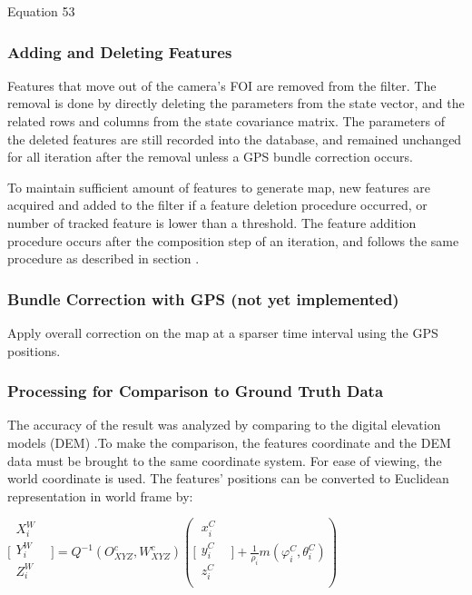 Equation 53

\subsubsection{Adding and Deleting 
Features}\label{section:_Toc332876136}
Features that move out of the camera's FOI are removed from the filter. 
The removal is done by directly deleting the parameters from the state 
vector, and the related rows and columns from the state covariance 
matrix. The parameters of the deleted features are still recorded into 
the database, and remained unchanged for all iteration after the removal 
unless a GPS bundle correction occurs. 

To maintain sufficient amount of features to generate map, new features 
are acquired and added to the filter if a feature deletion procedure 
occurred, or number of tracked feature is lower than a threshold. The 
feature addition procedure occurs after the composition step of an 
iteration, and follows the same procedure as described in section . 

\subsubsection{Bundle Correction with GPS (not yet 
implemented)}\label{section:_Toc332876138}
Apply overall correction on the map at a sparser time interval using the 
GPS positions. 

\subsubsection{Processing for Comparison to Ground Truth Data}
The accuracy of the result was analyzed by comparing to the digital 
elevation models (DEM) .To make the comparison, the features coordinate 
and the DEM data must be brought to the same coordinate system. For ease 
of viewing, the world coordinate is used. The features' positions can be 
converted to Euclidean representation in world frame by: 

$\lbrack \begin{matrix}
X_{i}^{W} & \\
Y_{i}^{W} & \\
Z_{i}^{W} & \\
\end{matrix}
\rbrack =Q^{-1}(O_{XYZ}^{c}, W_{XYZ}^{c})(\lbrack \begin{matrix}
x_{i}^{C} & \\
y_{i}^{C} & \\
z_{i}^{C} & \\
\end{matrix}
\rbrack +\frac{1}{\rho _{i}}m(\varphi _{i}^{C}, \theta _{i}^{C}))$\\


